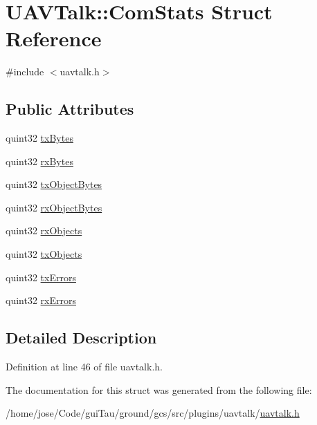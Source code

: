 \hypertarget{struct_u_a_v_talk_1_1_com_stats}{\section{U\-A\-V\-Talk\-:\-:Com\-Stats Struct Reference}
\label{struct_u_a_v_talk_1_1_com_stats}
}


{\ttfamily \#include $<$uavtalk.\-h$>$}

\subsection*{Public Attributes}
\begin{DoxyCompactItemize}
\item 
quint32 \hyperlink{group___u_a_v_talk_plugin_ga6ab32543081346e61bdc67874617d3e1}{tx\-Bytes}
\item 
quint32 \hyperlink{group___u_a_v_talk_plugin_ga93a6f8b7f60333a7e7afb70085ca7efd}{rx\-Bytes}
\item 
quint32 \hyperlink{group___u_a_v_talk_plugin_gaf811665cd1c815ac65764deff354ba6c}{tx\-Object\-Bytes}
\item 
quint32 \hyperlink{group___u_a_v_talk_plugin_ga6a61f515e2c09de8fadddb1d8382a2a1}{rx\-Object\-Bytes}
\item 
quint32 \hyperlink{group___u_a_v_talk_plugin_ga60c07de32f4130a7b761066819bf0712}{rx\-Objects}
\item 
quint32 \hyperlink{group___u_a_v_talk_plugin_ga4d48878de025a87f65263e537467fb9b}{tx\-Objects}
\item 
quint32 \hyperlink{group___u_a_v_talk_plugin_gaddc2324ebd5b83b73e1f873131efcccf}{tx\-Errors}
\item 
quint32 \hyperlink{group___u_a_v_talk_plugin_ga52c1d5163810f507e6ca052884ee7ecc}{rx\-Errors}
\end{DoxyCompactItemize}


\subsection{Detailed Description}


Definition at line 46 of file uavtalk.\-h.



The documentation for this struct was generated from the following file\-:\begin{DoxyCompactItemize}
\item 
/home/jose/\-Code/gui\-Tau/ground/gcs/src/plugins/uavtalk/\hyperlink{uavtalk_8h}{uavtalk.\-h}\end{DoxyCompactItemize}
